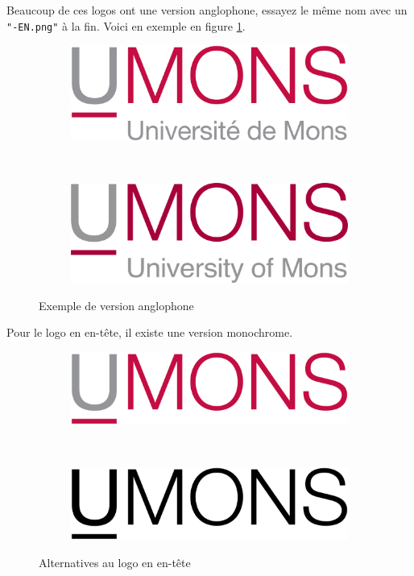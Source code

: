 \documentclass{umonsreport}
\begin{document}
Beaucoup de ces logos ont une version anglophone, essayez le même nom avec un \texttt{"-EN.png"} à la fin. Voici en exemple en figure \ref{en-logos}.
\begin{figure}[H]
    \centering
    \begin{subfigure}[t]{.4\textwidth}
        \centering
        \includegraphics[width=\textwidth]{logos/Umons.png}
    \end{subfigure}
    ~\hspace{3em}
    \begin{subfigure}[t]{.4\textwidth}
        \centering
        \includegraphics[width=\textwidth]{logos/Umons-EN.png}
    \end{subfigure}
    \caption{Exemple de version anglophone}
    \label{en-logos}
\end{figure}

Pour le logo en en-tête, il existe une version monochrome.
\begin{figure}[H]
    \centering
    \begin{subfigure}[t]{.4\textwidth}
        \centering
        \includegraphics[width=\textwidth]{logos/small-Umons.png}
    \end{subfigure}
    ~\hspace{3em}
    \begin{subfigure}[t]{.4\textwidth}
        \centering
        \includegraphics[width=\textwidth]{logos/small-Umons-black.png}
    \end{subfigure}
    \caption{Alternatives au logo en en-tête}
    \label{heading-logos}
\end{figure}
\end{document}
